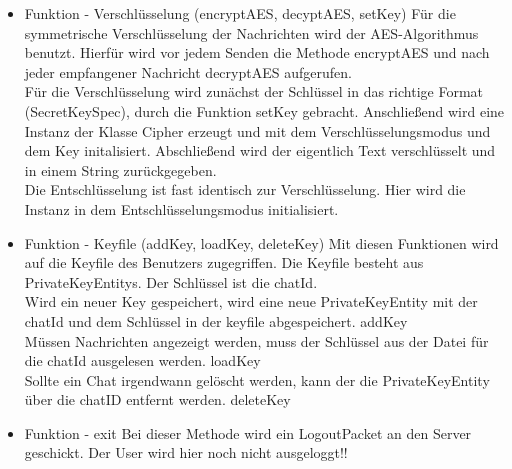 \begin{itemize}
    
    \item Funktion - Verschlüsselung (encryptAES, decyptAES, setKey)
    Für die symmetrische Verschlüsselung der Nachrichten wird der AES-Algorithmus benutzt. Hierfür wird vor jedem Senden
    die Methode encryptAES und nach jeder empfangener Nachricht decryptAES aufgerufen.\\
    Für die Verschlüsselung wird zunächst der Schlüssel in das richtige Format (SecretKeySpec), durch die Funktion
    setKey gebracht. Anschließend wird eine Instanz der Klasse Cipher erzeugt und mit dem Verschlüsselungsmodus und
    dem Key initalisiert. Abschließend wird der eigentlich Text verschlüsselt und in einem String zurückgegeben. \\
    Die Entschlüsselung ist fast identisch zur Verschlüsselung. Hier wird die Instanz in dem Entschlüsselungsmodus
    initialisiert.
    
    \item Funktion - Keyfile (addKey, loadKey, deleteKey)
    Mit diesen Funktionen wird auf die Keyfile des Benutzers zugegriffen. Die Keyfile besteht aus PrivateKeyEntitys.
    Der Schlüssel ist die chatId. \\
    Wird ein neuer Key gespeichert, wird eine neue PrivateKeyEntity mit der chatId und dem Schlüssel in der keyfile
    abgespeichert. addKey\\
    Müssen Nachrichten angezeigt werden, muss der Schlüssel aus der Datei für die chatId ausgelesen werden. loadKey \\
    Sollte ein Chat irgendwann gelöscht werden, kann der die PrivateKeyEntity über die chatID entfernt werden. deleteKey\\
    
    \item Funktion - exit
    Bei dieser Methode wird ein LogoutPacket an den Server geschickt. Der User wird hier noch nicht ausgeloggt!!
    
\end{itemize}


